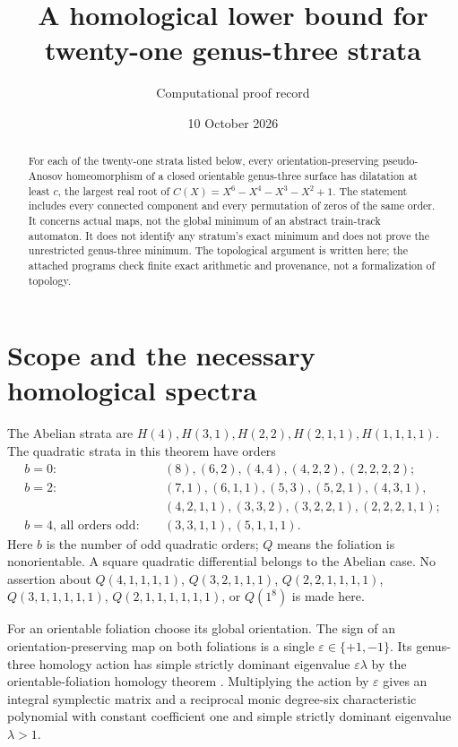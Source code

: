 \documentclass[11pt]{article}
\title{A homological lower bound for twenty-one genus-three strata}
\author{Computational proof record}
\date{10 October 2026}
\newcommand{\pa}{pseudo-Anosov}
\begin{document}
\maketitle
\begin{abstract}
For each of the twenty-one strata listed below, every orientation-preserving
\pa{} homeomorphism of a closed orientable genus-three surface has dilatation
at least $c$, the largest real root of
$C(X)=X^6-X^4-X^3-X^2+1$. The statement includes every connected component and
every permutation of zeros of the same order. It concerns actual maps, not
the global minimum of an abstract train-track automaton. It does not identify
any stratum's exact minimum and does not prove the unrestricted genus-three
minimum. The topological argument is written here; the attached programs
check finite exact arithmetic and provenance, not a formalization of topology.
\end{abstract}

\section{Scope and the necessary homological spectra}
The Abelian strata are $H(4),H(3,1),H(2,2),H(2,1,1),H(1,1,1,1)$.
The quadratic strata in this theorem have orders
\begin{align*}
 b=0:&\quad (8),(6,2),(4,4),(4,2,2),(2,2,2,2);\\
 b=2:&\quad (7,1),(6,1,1),(5,3),(5,2,1),(4,3,1),\\
 &\quad(4,2,1,1),(3,3,2),(3,2,2,1),(2,2,2,1,1);\\
 b=4\text{, all orders odd}:&\quad(3,3,1,1),(5,1,1,1).
\end{align*}
Here $b$ is the number of odd quadratic orders; $Q$ means the foliation is
nonorientable. A square quadratic differential belongs to the Abelian case.
No assertion about $Q(4,1,1,1,1)$, $Q(3,2,1,1,1)$, $Q(2,2,1,1,1,1)$,
$Q(3,1,1,1,1,1)$, $Q(2,1,1,1,1,1,1)$, or $Q(1^8)$ is made here.

For an orientable foliation choose its global orientation. The sign of an
orientation-preserving map on both foliations is a single
$\varepsilon\in\{+1,-1\}$. Its genus-three homology action has simple
strictly dominant eigenvalue $\varepsilon\lambda$ by the orientable-foliation
homology theorem \cite[Theorem 2.2]{LT}. Multiplying the action by
$\varepsilon$ gives an integral symplectic matrix and a reciprocal monic
degree-six characteristic polynomial with constant coefficient one and
simple strictly dominant eigenvalue $\lambda>1$.
\end{document}
